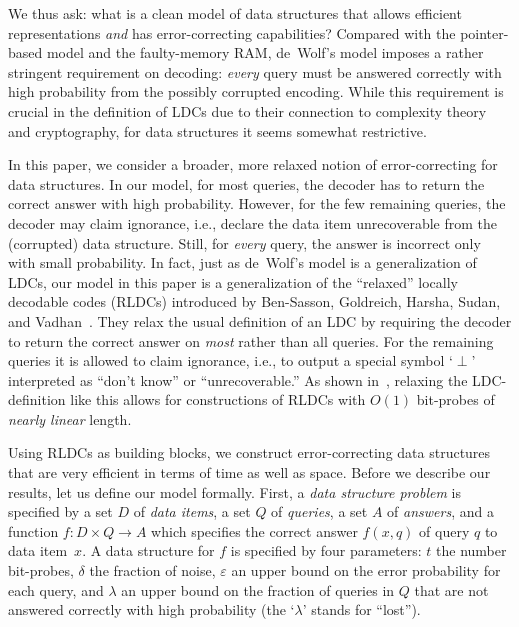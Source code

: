\documentclass[11pt,english]{article}
\theoremstyle{definition}
\theoremstyle{remark}
\newcommand{\eps}{\varepsilon}
\begin{document}
We thus ask: what is a clean model of data structures that allows
efficient representations \emph{and} has error-correcting capabilities?
Compared with the pointer-based model and the faulty-memory RAM, de~Wolf's
model imposes a rather stringent requirement on decoding: \emph{every}
query must be answered correctly with high probability from the possibly corrupted
encoding. While this requirement is crucial in the definition of LDCs
due to their connection to complexity theory and cryptography, for
data structures it seems somewhat restrictive.

In this paper, we consider a broader, more relaxed notion of error-correcting for data structures. 
In our model, for most queries, the decoder has to return the correct answer with
high probability.  However, for the few remaining queries, the decoder may claim ignorance, 
i.e., declare the data item unrecoverable from the (corrupted) data structure. 
Still, for \emph{every} query, the answer is incorrect only with small probability.
In fact, just as de~Wolf's model is a generalization of LDCs, our model in this paper
is a generalization of the ``relaxed'' locally decodable codes (RLDCs) introduced
by Ben-Sasson, Goldreich, Harsha, Sudan, and Vadhan~\cite{bghsv04}.
They relax the usual definition of an LDC by requiring the decoder
to return the correct answer on \emph{most} rather than all queries.
For the remaining queries it is allowed to claim ignorance, i.e.,
to output a special symbol `$\perp$' interpreted as ``don't know''
or ``unrecoverable.'' As shown in~\cite{bghsv04}, relaxing the
LDC-definition like this allows for constructions of RLDCs
with $O(1)$ bit-probes of \emph{nearly linear} length. 

Using RLDCs as building blocks, we construct error-correcting data structures that are very efficient in terms of time
as well as space. Before we describe our results, let us define
our model formally. First, a \emph{data structure problem} is specified
by a set $D$ of \emph{data items}, a set $Q$ of \emph{queries},
a set $A$ of \emph{answers}, and a function $f:D\times Q\rightarrow A$
which specifies the correct answer $f(x,q)$ of query $q$ to data
item~$x$. A data structure for $f$ is specified by four parameters:
$t$ the number bit-probes, $\delta$ the fraction of noise, $\eps$ an upper
bound on the error probability for each query, and $\lambda$ an upper bound on
the fraction of queries in $Q$ that are not answered correctly with high probability 
(the `$\lambda$' stands for ``lost'').
\end{document}
